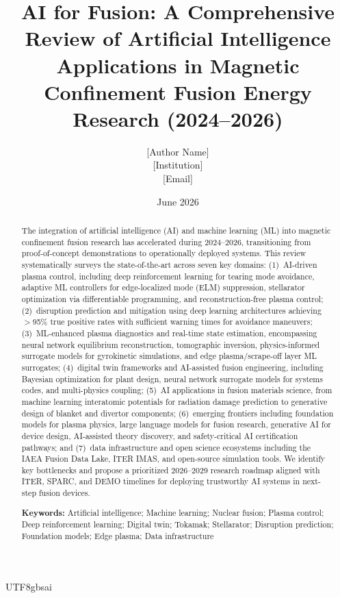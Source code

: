 \documentclass[12pt,a4paper]{article}
\title{AI for Fusion: A Comprehensive Review of Artificial Intelligence Applications in Magnetic Confinement Fusion Energy Research (2024--2026)}
\author{[Author Name]\\[0.5em]
\small [Institution]\\[0.3em]
\small [Email]}
\date{June 2026}
\begin{document}
\begin{CJK}{UTF8}{gbsai}
\maketitle

\begin{abstract}
The integration of artificial intelligence (AI) and machine learning (ML) into magnetic confinement fusion research has accelerated during 2024--2026, transitioning from proof-of-concept demonstrations to operationally deployed systems. This review systematically surveys the state-of-the-art across seven key domains: (1)~AI-driven plasma control, including deep reinforcement learning for tearing mode avoidance, adaptive ML controllers for edge-localized mode (ELM) suppression, stellarator optimization via differentiable programming, and reconstruction-free plasma control; (2)~disruption prediction and mitigation using deep learning architectures achieving $>$95\% true positive rates with sufficient warning times for avoidance maneuvers; (3)~ML-enhanced plasma diagnostics and real-time state estimation, encompassing neural network equilibrium reconstruction, tomographic inversion, physics-informed surrogate models for gyrokinetic simulations, and edge plasma/scrape-off layer ML surrogates; (4)~digital twin frameworks and AI-assisted fusion engineering, including Bayesian optimization for plant design, neural network surrogate models for systems codes, and multi-physics coupling; (5)~AI applications in fusion materials science, from machine learning interatomic potentials for radiation damage prediction to generative design of blanket and divertor components; (6)~emerging frontiers including foundation models for plasma physics, large language models for fusion research, generative AI for device design, AI-assisted theory discovery, and safety-critical AI certification pathways; and (7)~data infrastructure and open science ecosystems including the IAEA Fusion Data Lake, ITER IMAS, and open-source simulation tools. We identify key bottlenecks and propose a prioritized 2026--2029 research roadmap aligned with ITER, SPARC, and DEMO timelines for deploying trustworthy AI systems in next-step fusion devices.

\medskip
\noindent\textbf{Keywords:} Artificial intelligence; Machine learning; Nuclear fusion; Plasma control; Deep reinforcement learning; Digital twin; Tokamak; Stellarator; Disruption prediction; Foundation models; Edge plasma; Data infrastructure
\end{abstract}


\end{CJK}
\end{document}
